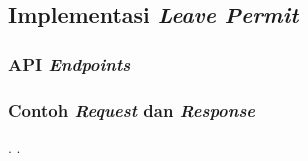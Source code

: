 \subsection{Implementasi \textit{Leave Permit}}
\subsubsection{API \textit{Endpoints}}
\subsubsection{Contoh \textit{Request} dan \textit{Response}}




\clearpage
.
\clearpage
.
\clearpage


